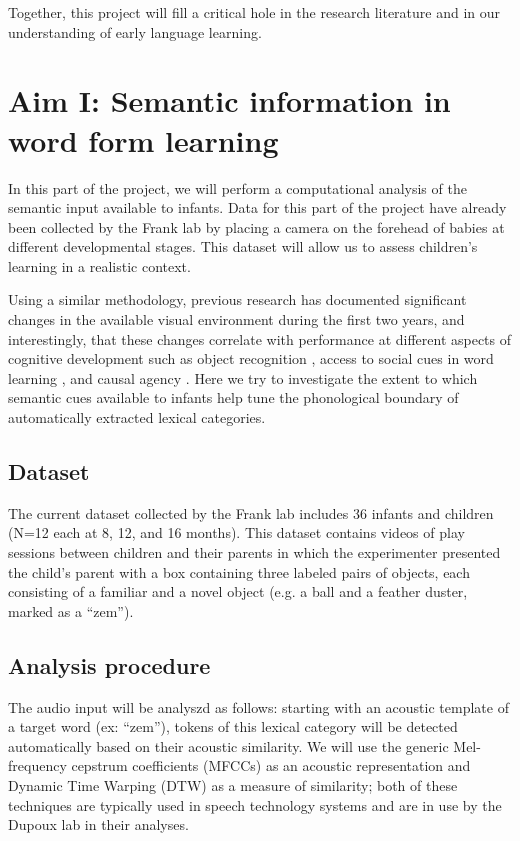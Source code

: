 \documentclass[12pt]{article}
\begin{document}
\noindent Together, this project will fill a critical hole in the research literature and in our understanding of early language learning. 


\section{Aim I: Semantic information in word form learning}

In this part of the project, we will perform a computational analysis of the semantic input available to infants. Data for this part of the project have already been collected by the Frank lab by placing a camera on the forehead of babies at different developmental stages. This dataset will allow us to assess children's learning in a realistic context.

Using a similar methodology, previous research has documented significant changes in the available visual environment during the first two years, and interestingly, that these changes correlate with performance at different aspects of cognitive development such as object recognition \cite{james2013}, access to social cues in word learning \cite{frank2013}, and causal agency \cite{cicchino2011}.
Here we try to investigate the extent to which semantic cues available to infants help tune the phonological boundary of automatically extracted lexical categories. 

\subsection{Dataset}

The current dataset collected by the Frank lab includes 36 infants and children (N=12 each at 8, 12, and 16 months). This dataset contains videos of play sessions between children and their parents in which the experimenter presented the child’s parent with a box containing three labeled pairs of objects, each consisting of a familiar and a novel object (e.g. a ball and a feather duster, marked as a ``zem'').

\subsection{Analysis procedure}

The audio input will be analyszd as follows:  starting with an acoustic template of a target word (ex: ``zem''), tokens of this lexical category will be detected automatically based on their acoustic similarity. We will use the generic Mel-frequency cepstrum coefficients (MFCCs) as an acoustic representation and Dynamic Time Warping (DTW) as a measure of similarity; both of these techniques are typically used in speech technology systems and are in use by the Dupoux lab in their analyses. 
\end{document}

